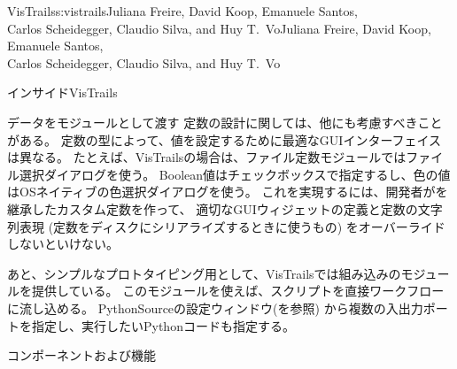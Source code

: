 \begin{aosachaptertoc}{VisTrails}{s:vistrails}{Juliana Freire, David Koop, Emanuele Santos, \\ Carlos Scheidegger, Claudio Silva, and Huy T.\ Vo}{Juliana Freire, David Koop, Emanuele Santos, \\ \hspace*{0.9cm} Carlos Scheidegger, Claudio Silva, and Huy T.\ Vo}
\begin{aosasect1}{インサイドVisTrails}
\begin{aosasect2}{データをモジュールとして渡す}
定数の設計に関しては、他にも考慮すべきことがある。
定数の型によって、値を設定するために最適なGUIインターフェイスは異なる。
たとえば、VisTrailsの場合は、ファイル定数モジュールではファイル選択ダイアログを使う。
Boolean値はチェックボックスで指定するし、色の値はOSネイティブの色選択ダイアログを使う。
これを実現するには、開発者がを継承したカスタム定数を作って、
適切なGUIウィジェットの定義と定数の文字列表現
(定数をディスクにシリアライズするときに使うもの)
をオーバーライドしないといけない。

あと、シンプルなプロトタイピング用として、VisTrailsでは組み込みのモジュールを提供している。
このモジュールを使えば、スクリプトを直接ワークフローに流し込める。
PythonSourceの設定ウィンドウ(を参照)
から複数の入出力ポートを指定し、実行したいPythonコードも指定する。

\end{aosasect2}

\end{aosasect1}

\begin{aosasect1}{コンポーネントおよび機能}


\end{aosasect1}
\end{aosachaptertoc}
